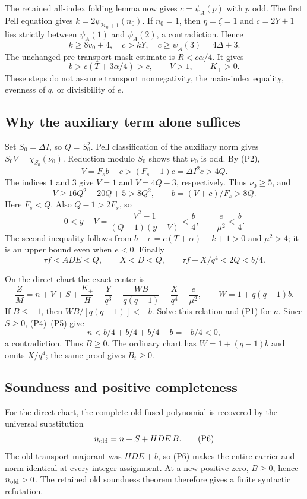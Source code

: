 The retained all-index folding lemma now gives $c=\psi_A(p)$ with $p$ odd. The first Pell equation gives $k=2\psi_{2v_0+1}(n_0)$. If $n_0=1$, then $\eta=\zeta=1$ and $c=2Y+1$ lies strictly between $\psi_A(1)$ and $\psi_A(2)$, a contradiction. Hence
\[
 k\ge8v_0+4,\quad c>kY,\quad c\ge\psi_A(3)=4\Delta+3.
\]
The unchanged pre-transport mask estimate is $R<c\alpha/4$. It gives
\[
 b>c(T+3\alpha/4)>c,\qquad V>1,\qquad K_+>0. \tag{P2}
\]
These steps do not assume transport nonnegativity, the main-index equality, evenness of $q$, or divisibility of $e$.

\subsection{Why the auxiliary term alone suffices}
Set $S_0=\Delta I$, so $Q=S_0^2$. Pell classification of the auxiliary norm gives $S_0V=\chi_{S_0}(\nu_0)$. Reduction modulo $S_0$ shows that $\nu_0$ is odd. By (P2),
\[
 V=F_sb-c>(F_s-1)c=\Delta I^2c>4Q.
\]
The indices $1$ and $3$ give $V=1$ and $V=4Q-3$, respectively. Thus $\nu_0\ge5$, and
\[
 V\ge16Q^2-20Q+5>8Q^2,\qquad
 b=(V+c)/F_s>8Q. \tag{P3}
\]
Here $F_s<Q$. Also $Q-1>2F_s$, so
\[
 0<y-V=\frac{V^2-1}{(Q-1)(y+V)}<\frac b4,
 \qquad \frac e{\mu^2}<\frac b4. \tag{P4}
\]
The second inequality follows from $b-e=c(T+\alpha)-k+1>0$ and $\mu^2>4$; it is an upper bound even when $e<0$. Finally
\[
 \tau f<ADE<Q,\qquad X<D<Q,
 \qquad \tau f+X/q^4<2Q<b/4. \tag{P5}
\]

On the direct chart the exact center is
\[
 \frac ZM=n+V+S+\frac{K_+}H+\frac Y{q^3}
 -\frac{WB}{q(q-1)}-\frac X{q^4}-\frac e{\mu^2},
 \qquad W=1+q(q-1)b.
\]
If $B\le-1$, then $WB/[q(q-1)]<-b$. Solve this relation and (P1) for $n$. Since $S\ge0$, (P4)--(P5) give
\[
 n<b/4+b/4+b/4-b=-b/4<0,
\]
a contradiction. Thus $B\ge0$. The ordinary chart has $W=1+(q-1)b$ and omits $X/q^4$; the same proof gives $B_t\ge0$.

\subsection{Soundness and positive completeness}
For the direct chart, the complete old fused polynomial is recovered by the universal substitution
\[
 n_{\rm old}=n+S+HDE\,B. \tag{P6}
\]
The old transport majorant was $HDE+b$, so (P6) makes the entire carrier and norm identical at every integer assignment. At a new positive zero, $B\ge0$, hence $n_{\rm old}>0$. The retained old soundness theorem therefore gives a finite syntactic refutation.

